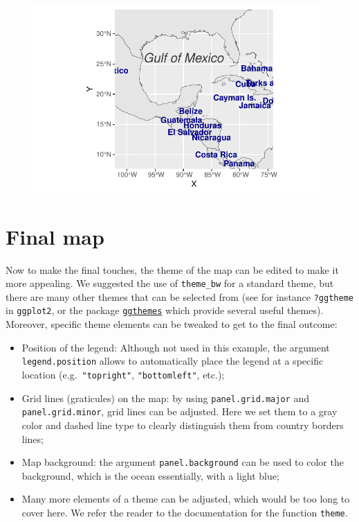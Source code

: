 \documentclass[
  letterpaper,
  DIV=11,
  numbers=noendperiod]{scrartcl}
\providecommand{\tightlist}{%
  \setlength{\itemsep}{0pt}\setlength{\parskip}{0pt}}\usepackage{longtable,booktabs,array}
\begin{document}
\begin{figure}[H]

{\centering \includegraphics{Introduction-to-mapping_files/figure-pdf/unnamed-chunk-14-1.pdf}

}

\end{figure}

\hypertarget{final-map}{%
\section{Final map}\label{final-map}}

Now to make the final touches, the theme of the map can be edited to
make it more appealing. We suggested the use of \texttt{theme\_bw} for a
standard theme, but there are many other themes that can be selected
from (see for instance \texttt{?ggtheme} in \texttt{ggplot2}, or the
package
\href{https://cran.r-project.org/package=ggthemes}{\texttt{ggthemes}}
which provide several useful themes). Moreover, specific theme elements
can be tweaked to get to the final outcome:

\begin{itemize}
\tightlist
\item
  Position of the legend: Although not used in this example, the
  argument \texttt{legend.position} allows to automatically place the
  legend at a specific location (e.g.~\texttt{"topright"},
  \texttt{"bottomleft"}, etc.);
\item
  Grid lines (graticules) on the map: by using \texttt{panel.grid.major}
  and \texttt{panel.grid.minor}, grid lines can be adjusted. Here we set
  them to a gray color and dashed line type to clearly distinguish them
  from country borders lines;
\item
  Map background: the argument \texttt{panel.background} can be used to
  color the background, which is the ocean essentially, with a light
  blue;
\item
  Many more elements of a theme can be adjusted, which would be too long
  to cover here. We refer the reader to the documentation for the
  function \texttt{theme}.
\end{itemize}
\end{document}
